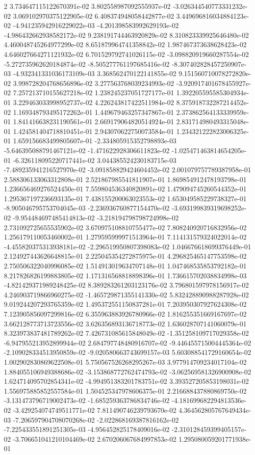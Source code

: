 2	3.734647115122670391e-02	3.802558987092555937e-02	-3.026344540773331232e-02	3.069102970375122905e-02	6.408374948058442877e-02	3.449696816034884123e-02	-4.941235942916229022e-03	-4.201398583992629193e-02	-4.986432662938582172e-02	9.238191744463920829e-02	8.310823339925646480e-02	4.460048745264977299e-02	8.651879964741358842e-02	1.987467373638628423e-02	4.646027664271121932e-02	6.701529792741026115e-02	-3.098820919660287554e-02	-5.272735962620184874e-02	-8.505277761197685416e-02	-8.307402828457250907e-03	-4.932341331036173109e-03	3.368562470122141855e-02	9.151560710078272820e-02	3.998728204768656896e-02	3.277563768039234993e-02	-3.920917401678455927e-02	7.257213710155627218e-02	1.238245237051727177e-01	1.392205595585304934e-01	3.229463033998952737e-02	4.226243817422511984e-02	8.375918732287214452e-02	1.169348793495172262e-01	1.449679463257347867e-01	2.373862564133339959e-01	1.841416638231190561e-01	2.669179064820514924e-01	2.831714980493315048e-01	1.424581404718810451e-01	2.943070622750073584e-01	1.234321222823006325e-01	1.659156683499805607e-01	-2.334805915352798893e-03	-5.646395088791467121e-02	-1.471622928306611823e-02	-1.025471463814654205e-01	-6.326118095220717441e-02	3.044385524230183715e-03	-7.489235941216527970e-02	-3.091858829424604452e-02	2.001079757789387958e-01	2.588306133063312808e-01	2.521867985541811907e-01	1.869854912478193798e-01	1.236656469276524450e-01	7.559804536340820891e-02	1.479094745260544352e-01	1.295367197236693135e-01	7.438155200063023553e-02	1.653049585229738327e-01	-8.905046795753704045e-03	-2.236936760877154470e-02	-3.693199839319698252e-02	-9.954484697485414813e-02	-3.218194798798724998e-02	2.731092725655535902e-02	3.670975108810755477e-02	7.808240920716832956e-02	1.256179110053460002e-01	1.279595999971513964e-01	7.114131579324022014e-02	-4.455820375313938181e-02	-2.296519950807398083e-02	1.046676618699376449e-01	2.124927443626648815e-01	2.225045354272875975e-01	4.296825465147753598e-02	2.750506322040996085e-02	1.514913019634707148e-01	1.047468535853792182e-01	8.217826826199883805e-02	1.171316568818898396e-01	1.736615702038834998e-03	-4.821429371989248425e-02	8.389283261203123176e-02	3.796801597978156917e-02	4.246903719866960275e-02	-1.465729871355141330e-02	5.832428890988287928e-02	9.019244207293765359e-02	1.495372551150837281e-01	7.203950307927624308e-02	7.123905856097299816e-02	6.355963883926780966e-02	1.816255351669167697e-02	3.662128773713723556e-02	3.626356893136718773e-02	1.636028707141060079e-01	8.323973837481789262e-02	7.426731085615848049e-02	-1.351258109717029358e-02	-6.947955213952899944e-02	2.684797748480916707e-02	-9.446455715004445364e-02	-2.109028334513950859e-02	-9.020580663743699157e-03	5.603088541729160654e-02	1.002902830869622508e-01	5.750567526268295267e-03	3.977914709234017104e-02	1.884055106949388686e-02	-3.153868772762474793e-02	-3.062569581326900908e-02	1.624714095702854341e-02	-4.994951383201783751e-02	3.393527205853198031e-02	1.556975885852557584e-01	1.504525347978606375e-01	2.216688437880869750e-02	-3.131473796719002473e-02	-1.685259363786834746e-02	-4.181699682294813536e-02	-3.429254074749511771e-02	7.811490746239793670e-02	4.364562805767649434e-03	-7.206597904708070268e-02	-2.022868169387816162e-02	-7.225433551891251305e-03	-4.956452825178409016e-02	-2.310128459399405157e-02	-3.706651041210104469e-02	2.670206067684997853e-02	1.295080059201771938e-01
